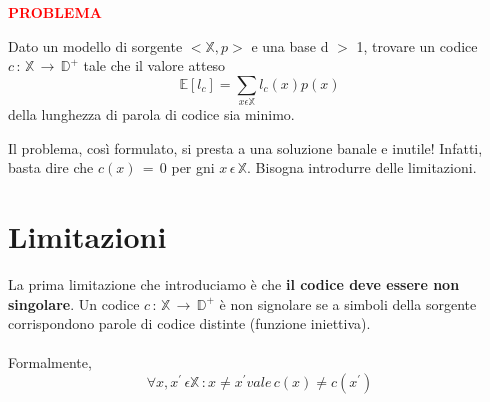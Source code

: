 \documentclass{article}
\begin{document}
    \vspace{5px}
    \begin{tcolorbox}
        \textbf{\textcolor{red}{PROBLEMA}}
        \vspace{5px}
        \begin{center}
            Dato un modello di sorgente $<\mathbb{X},p>$ e una base d $>$ 1, trovare un codice $c\,:\,\mathbb{X} \, \rightarrow \, \mathbb{D}^+$ tale che il valore atteso $$\mathbb{E}[l_c] = \sum_{x\epsilon\mathbb{X}} l_c(x) p(x)$$ della lunghezza di parola di codice sia minimo.
        \end{center}
    \end{tcolorbox}
    \vspace{5px}

    \noindent Il problema, così formulato, si presta a una soluzione banale e inutile! Infatti, basta dire che $c(x)\,=\,0$ per gni $x\,\epsilon\,\mathbb{X}$. Bisogna introdurre delle limitazioni.

    \section{Limitazioni}

    La prima limitazione che introduciamo è che \textbf{il codice deve essere non singolare}. Un codice $c\,:\,\mathbb{X}\,\rightarrow \, \mathbb{D}^+$ è non signolare se a simboli della sorgente corrispondono parole di codice distinte (funzione iniettiva).  \\
    \\
    Formalmente, $$\forall x,x^{'} \, \epsilon \mathbb{X}\,: x\neq x^{'} vale \, c(x) \neq c(x^{'})$$
\end{document}
